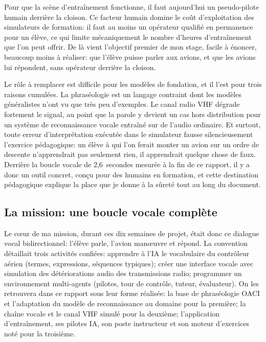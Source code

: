 \documentclass[11pt,a4paper]{article}
\begin{document}
Pour que la scène d'entraînement fonctionne, il faut aujourd'hui un pseudo-pilote humain derrière la cloison. Ce facteur humain domine le coût d'exploitation des simulateurs de formation: il faut au moins un opérateur qualifié en permanence pour un élève, ce qui limite mécaniquement le nombre d'heures d'entraînement que l'on peut offrir. De là vient l'objectif premier de mon stage, facile à énoncer, beaucoup moins à réaliser: que l'élève puisse parler aux avions, et que les avions lui répondent, sans opérateur derrière la cloison.

Le rôle à remplacer est difficile pour les modèles de fondation, et il l'est pour trois raisons cumulées. La phraséologie est un langage contraint dont les modèles généralistes n'ont vu que très peu d'exemples. Le canal radio VHF dégrade fortement le signal, au point que la parole y devient un cas hors distribution pour un système de reconnaissance vocale entraîné sur de l'audio ordinaire. Et surtout, toute erreur d'interprétation exécutée dans le simulateur fausse silencieusement l'exercice pédagogique: un élève à qui l'on ferait monter un avion sur un ordre de descente n'apprendrait pas seulement rien, il apprendrait quelque chose de faux. Derrière la boucle vocale de 2,6~secondes mesurée à la fin de ce rapport, il y a donc un outil concret, conçu pour des humains en formation, et cette destination pédagogique explique la place que je donne à la sûreté tout au long du document.

\subsection{La mission: une boucle vocale complète}

Le c\oe ur de ma mission, durant ces dix semaines de projet, était donc ce dialogue vocal bidirectionnel: l'élève parle, l'avion man\oe uvre et répond. La convention détaillait trois activités confiées: apprendre à l'IA le vocabulaire du contrôleur aérien (termes, expressions, séquences typiques); créer une interface vocale avec simulation des détériorations audio des transmissions radio; programmer un environnement multi-agents (pilotes, tour de contrôle, tuteur, évaluateur). On les retrouvera dans ce rapport sous leur forme réalisée: la base de phraséologie OACI et l'adaptation du modèle de reconnaissance au domaine pour la première; la chaîne vocale et le canal VHF simulé pour la deuxième; l'application d'entraînement, ses pilotes IA, son poste instructeur et son moteur d'exercices noté pour la troisième.
\end{document}

